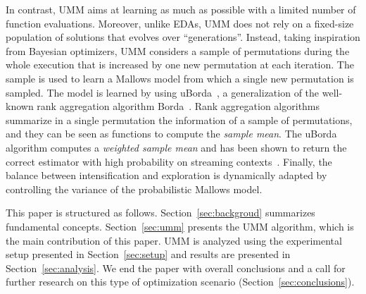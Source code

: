 \documentclass[sigconf,dvipsnames]{acmart}
\begin{document}
In contrast, UMM aims at learning as much as possible with a limited number of
function evaluations. Moreover, unlike EDAs, UMM does not rely on a fixed-size
population of solutions that evolves over ``generations''. Instead, taking
inspiration from Bayesian optimizers, UMM considers a sample of permutations
during the whole execution that is increased by one new permutation at each
iteration. The sample is used to learn a Mallows model from which a single new
permutation is sampled. The model is learned by using
uBorda~\cite{IruLobPer2020arxiv}, a generalization of the well-known rank
aggregation algorithm Borda~\cite{AliMei2011kemeny}. Rank aggregation algorithms
summarize in a single permutation the information of a sample of permutations,
and they can be seen as functions to compute the \emph{sample mean}. The uBorda
algorithm computes a \textit{weighted sample mean} and has been shown to return
the correct estimator with high probability on streaming
contexts~\cite{IruLobPer2020arxiv}.
%
Finally, the balance between intensification and exploration is dynamically
adapted by controlling the variance of the probabilistic Mallows model.



This paper is structured as follows. Section~\ref{sec:backgroud} summarizes fundamental concepts.
Section~\ref{sec:umm} presents the UMM algorithm, which is the main contribution of this paper. UMM is analyzed using the experimental setup presented in Section~\ref{sec:setup} and results are presented in Section~\ref{sec:analysis}. We end the paper with overall conclusions and a call for further research on this type of optimization scenario (Section~\ref{sec:conclusions}).
\end{document}
